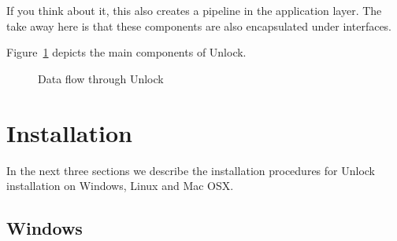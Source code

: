 \documentclass[11pt]{article}
\begin{document}
If you think about it, this also creates a pipeline in the application layer.  The take away here is that these components are also encapsulated under interfaces.

Figure~\ref{bci-pipeline-fig} depicts the main components of Unlock.

\begin{figure}[]
\caption{\label{bci-pipeline-fig}  Data flow through Unlock}
\end{figure}



\section{Installation}

In the next three sections we describe the installation procedures for Unlock installation on Windows, Linux and Mac OSX.  

\subsection{Windows}
\end{document}
